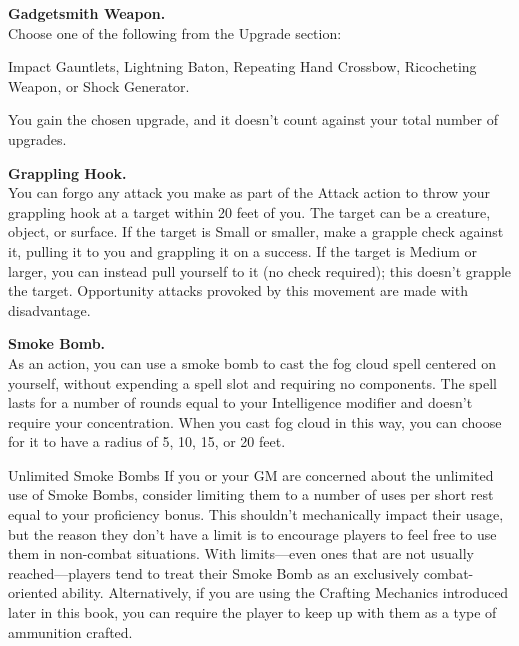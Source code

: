 \documentclass[11pt,twoside,openany]{book}  %
\begin{document}
\begin{multicols}{2}
\begin{fiveitemize}
	\item \textbf{Gadgetsmith Weapon.} \\ Choose one of the following from the Upgrade section: 
	\begin{fiveitemize}
		\item Impact Gauntlets, Lightning Baton, Repeating Hand Crossbow, Ricocheting Weapon, or Shock Generator. 
		\item You gain the chosen upgrade, and it doesn’t count against your total number of upgrades.
	\end{fiveitemize}
	\item \textbf{Grappling Hook.} \\ You can forgo any attack you make as part of the Attack action to throw your grappling hook at a target within 20 feet of you. The target can be a creature, object, or surface. If the target is Small or smaller, make a grapple check against it, pulling it to you and grappling it on a success. If the target is Medium or larger, you can instead pull yourself to it (no check required); this doesn’t grapple the target. Opportunity attacks provoked by this movement are made with disadvantage.
\newpage
\end{fiveitemize}
\end{multicols}
\twocolumn
\begin{fiveitemize}
	\item \textbf{Smoke Bomb.} \\ As an action, you can use a smoke bomb to cast the fog cloud spell centered on yourself, without expending a spell slot and requiring no components. The spell lasts for a number of rounds equal to your Intelligence modifier and doesn’t require your concentration. When you cast fog cloud in this way, you can choose for it to have a radius of 5, 10, 15, or 20 feet.
\end{fiveitemize}

\begin{CalloutBox}{Unlimited Smoke Bombs}
If you or your GM are concerned about the unlimited use of Smoke Bombs, consider limiting them to a number of uses per short rest equal to your proficiency bonus. This shouldn’t mechanically impact their usage, but the reason they don’t have a limit is to encourage players to feel free to use them in non-combat situations. With limits—even ones that are not usually reached—players tend to treat their Smoke Bomb as an exclusively combat-oriented ability. Alternatively, if you are using the Crafting Mechanics introduced later in this book, you can require the player to keep up with them as a type of ammunition crafted.
\end{CalloutBox}
\end{document}
